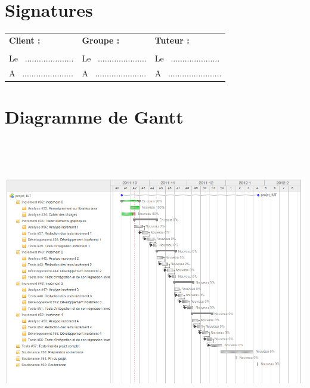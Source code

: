 \documentclass[12pt,a4paper,openany]{article}
\begin{document}

\section*{Signatures}
\vspace{20px}
\begin{tabular}[center]{p{175px}p{175px}p{175px}}
  \textbf{Client :} & \textbf{Groupe :} & \textbf{Tuteur :} \\
  \\
  Le ~..................... & Le ~..................... & Le ~..................... \\
  A ~...................... & A ~...................... & A ~....................... \\
\end{tabular}
\newpage
\appendix
\section{Diagramme de Gantt}
\label{gantt}
\hspace{20px}
\vspace{-330px}
\includegraphics[height=470px, angle=-90]{projetiut-gantt.png}
\newpage
\end{document}
